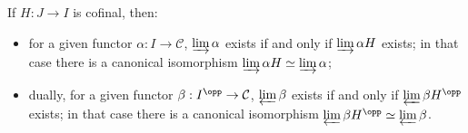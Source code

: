 \begin{proposition}\label{prop:cofinal-lim}
	If $H: J \to I$ is cofinal, then:
	\begin{itemize}
		\item for a given functor $\alpha: I \to \mathcal{C}$,
		$\varinjlim \alpha$ exists if and only if $\varinjlim \alpha H$ exists;
		in that case there is a canonical isomorphism
		$\varinjlim \alpha H \simeq \varinjlim \alpha$;
		\item dually, for a given functor
		$\beta: I^{\opp} \to \mathcal{C}$, $\varprojlim \beta$ exists if and
		only if $\varprojlim \beta H^{\opp}$ exists; in that case there is a
		canonical isomorphism
		$\varprojlim \beta H^{\opp} \simeq \varprojlim \beta$.
	\end{itemize}
\end{proposition}
